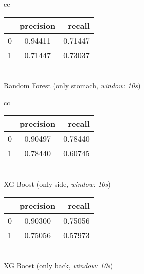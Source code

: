 \begin{table}
\begin{tabular}{cc}
      \begin{minipage}{0.33\textwidth}
          \begin{center}
              \begin{tabular}{ | l | c | r | }
                \hline
                 & precision & recall \\ \hline
                0 & 0.94411 & 0.71447 \\ \hline
                1 & 0.71447 & 0.73037 \\
                \hline
              \end{tabular}
              \smallskip
              \\ Random Forest (only stomach, \textit{window: 10s})
          \end{center}
      \end{minipage}
  \end{tabular}
  \newline
  \vspace*{5mm}
  \newline
  \begin{tabular}{cc}
      \begin{minipage}{0.33\textwidth}
          \begin{center}
              \begin{tabular}{ | l | c | r | }
                \hline
                 & precision & recall \\ \hline
                0 & 0.90497 & 0.78440 \\ \hline
                1 & 0.78440 & 0.60745 \\
                \hline
              \end{tabular}
              \smallskip
              \\ XG Boost (only side, \textit{window: 10s})
          \end{center}
      \end{minipage}

      \begin{minipage}{0.33\textwidth}
          \begin{center}
              \begin{tabular}{ | l | c | r | }
                \hline
                 & precision & recall \\ \hline
                0 & 0.90300 & 0.75056 \\ \hline
                1 & 0.75056 & 0.57973 \\
                \hline
              \end{tabular}
              \smallskip
              \\ XG Boost (only back, \textit{window: 10s})
          \end{center}
      \end{minipage}
  

\end{tabular}
\end{table}
